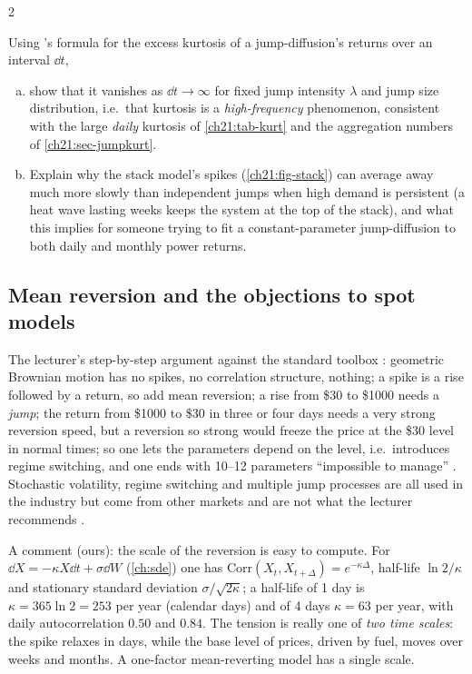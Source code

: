 \begin{paracol}{2}
\begin{exercise}\label{ch21:ex-jumpagg}
Using 's formula for the excess kurtosis of a jump-diffusion's returns over an interval $\dd t$,
\begin{enumerate}[(a)]
  \item show that it vanishes as $\dd t\to\infty$ for
      fixed jump intensity $\lambda$ and jump size distribution, i.e.\ that kurtosis is a \emph{high-frequency} phenomenon, consistent with the large \emph{daily} kurtosis of \cref{ch21:tab-kurt} and the aggregation numbers of \cref{ch21:sec-jumpkurt}.
  \item Explain why the stack model's spikes (\cref{ch21:fig-stack}) can average away much more slowly than independent jumps when high demand is persistent (a heat wave lasting weeks keeps the system at the top of the stack), and what this implies
      for someone trying to fit a constant-parameter jump-diffusion to both daily and monthly power returns.
\end{enumerate}
\end{exercise}

\subsection{Mean reversion and the objections to spot models}
The lecturer's step-by-step argument against the standard toolbox :
geometric Brownian motion has no spikes, no correlation structure, nothing; a spike is a rise followed by a return, so add mean reversion; a rise from \$30 to \$1000 needs a \emph{jump}; the return from \$1000 to \$30 in three or four days needs a very strong reversion speed, but a reversion so strong
would freeze the price at the \$30 level in normal times; so one lets the parameters depend on the level, i.e.\ introduces regime switching, and one ends with 10--12 parameters ``impossible to manage'' . Stochastic volatility, regime switching and multiple jump processes are all used in the industry but
come from other markets and are not what the lecturer recommends .

A comment (ours): the scale of the reversion is easy to compute. For $\dd X=-\kappa X\dd t+\sigma\dd W$ (\cref{ch:sde}) one has $\mathrm{Corr}(X_t,X_{t+\Delta})=e^{-\kappa\Delta}$, half-life $\ln2/\kappa$ and stationary standard deviation $\sigma/\sqrt{2\kappa}$; a half-life of 1 day is $\kappa=365\ln2=253$ per year (calendar days) and of 4 days
$\kappa=63$ per year, with daily autocorrelation $0.50$ and $0.84$. The tension is really one of \emph{two time scales}: the spike relaxes in days, while the base level of prices, driven by fuel, moves over weeks and months. A one-factor mean-reverting model has a single scale.


\end{paracol}
